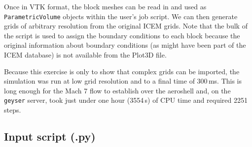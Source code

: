 \medskip
Once in VTK format, the block meshes can be read in and used as 
\texttt{ParametricVolume} objects within the user's job script.
We can then generate grids of arbitrary resolution from the original ICEM grids.
Note that the bulk of the script is used to assign the boundary conditions 
to each block because the original information about boundary conditions (as
might have been part of the ICEM database) is not available from the Plot3D file.

\medskip
Because this exercise is only to show that complex grids can be imported, the
simulation was run at low grid resolution and to a final time of 300\,ms.
This is long enough for the Mach 7 flow to establish over the aeroshell and,
on the \texttt{geyser} server, took just under one hour (3554\,s) of CPU time 
and required 2251 steps.

\bigskip
\subsection{Input script (.py)}
\topbar

\bottombar

